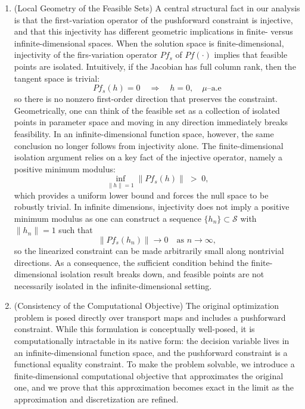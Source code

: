 \documentclass[12pt,leqno]{amsart}
\begin{document}
\begin{enumerate}[leftmargin=*, label=\arabic*.]

\item (Local Geometry of the Feasible Sets) 
A central structural fact in our analysis is that the first-variation operator of the pushforward constraint is injective, and that this injectivity has different geometric implications in finite- versus infinite-dimensional spaces.
When the solution space is finite-dimensional, injectivity of the firs-variation operator $Pf_s$ of $Pf(\cdot)$ implies that feasible points are isolated. Intuitively, if the Jacobian has full column rank, then the tangent
space is trivial:
\[
Pf_s(h)=0 \quad \Longrightarrow \quad h=0, \quad \mu\text{--a.e}
\]
so there is no nonzero first-order direction that preserves the constraint. Geometrically, one can think of the feasible set as a collection of isolated points in parameter space and moving in any direction immediately breaks feasibility.
In an infinite-dimensional function space, however, the same conclusion no longer follows from injectivity alone.
The finite-dimensional isolation argument relies on a key fact of the injective operator, namely a positive minimum modulus:
\[
\inf_{\|h\|=1}\|Pf_s(h)\| \;>\; 0,
\]
which provides a uniform lower bound and forces the null space to be robustly trivial. In infinite dimensions, injectivity does not imply a positive minimum modulus as one can construct a sequence
$\{h_n\}\subset \mathcal{S}$ with $\|h_n\|=1$ such that
\[
\|Pf_s(h_n)\| \to 0 \quad \text{as } n\to\infty,
\]
so the linearized constraint can be made arbitrarily small along nontrivial directions. As a consequence, the sufficient condition behind the finite-dimensional isolation result breaks down, and feasible points are not necessarily isolated in the infinite-dimensional setting.

\item (Consistency of the Computational Objective)
The original optimization problem is posed directly over transport maps and includes a pushforward constraint. While this formulation is conceptually well-posed, it is computationally intractable in its native form: the decision variable lives in an infinite-dimensional function space, and the pushforward constraint is a functional equality constraint. To make the problem solvable, we introduce a finite-dimensional computational objective that approximates the original one, and we prove that this approximation becomes exact in the limit as the approximation and discretization are refined. 


\end{enumerate}
\end{document}
